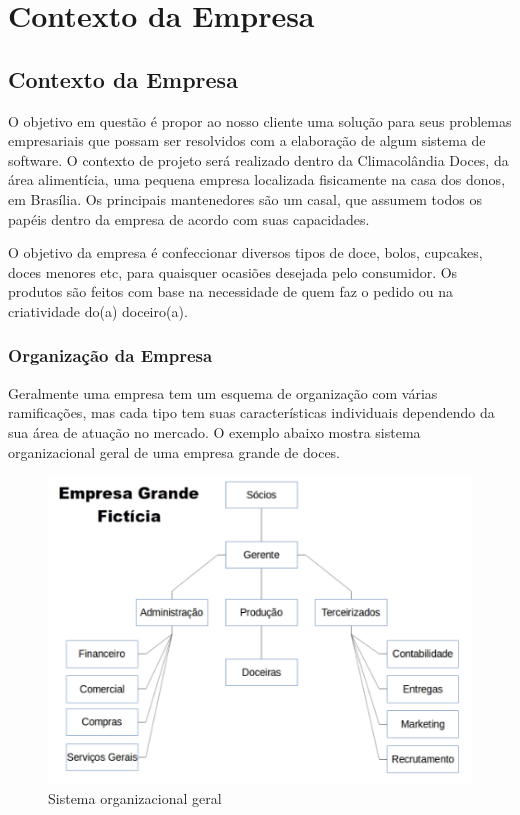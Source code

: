 \part{Contexto da Empresa}

\chapter[Contexto da Empresa]{Contexto da Empresa} \label{doc:cont}

O objetivo em questão é propor ao nosso cliente uma solução para seus problemas empresariais que possam ser resolvidos com a elaboração de algum sistema de software. O contexto de projeto será realizado dentro da Climacolândia Doces, da área alimentícia, uma pequena empresa localizada fisicamente na casa dos donos, em Brasília. Os principais mantenedores são um casal, que assumem todos os papéis dentro da empresa de acordo com suas capacidades.

O objetivo da empresa é confeccionar diversos tipos de doce, bolos, cupcakes, doces menores etc, para quaisquer ocasiões desejada pelo consumidor. Os produtos são feitos com base na necessidade de quem faz o pedido ou na criatividade do(a) doceiro(a).


\section{Organização da Empresa}

Geralmente uma empresa tem um esquema de organização com várias ramificações, mas cada tipo tem suas características individuais dependendo da sua área de atuação no mercado. O exemplo abaixo mostra sistema organizacional geral de uma empresa grande de doces.

\begin{figure}[h!]
	\centering
	\includegraphics[scale=0.7]{figuras/grande.png}
	\caption{Sistema organizacional geral}
\end{figure}

